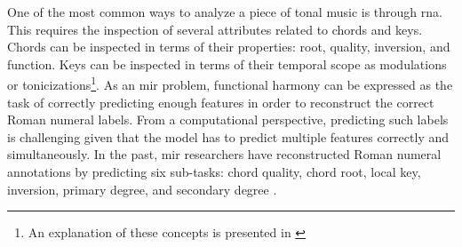 

One of the most common ways to analyze a piece of tonal
music is through \gls{rna}. This requires the
inspection of several attributes related to chords and keys.
Chords can be inspected in terms of their properties: root,
quality, inversion, and function. Keys can be inspected in
terms of their temporal scope as modulations or
tonicizations\footnote{An explanation of these concepts is
presented in \textcite{napoleslopez2020local}}. As an \gls{mir}
problem, functional harmony can be expressed as the task of
correctly predicting enough features in order to reconstruct
the correct Roman numeral labels. From a computational
perspective, predicting such labels is challenging
given that the model has to predict multiple features
correctly and simultaneously. In the past, \gls{mir} researchers
have reconstructed Roman numeral annotations by predicting
six sub-tasks: chord quality, chord root, local key,
inversion, primary degree, and secondary degree
\parencite{chen2018functional, micchi2020not}.

